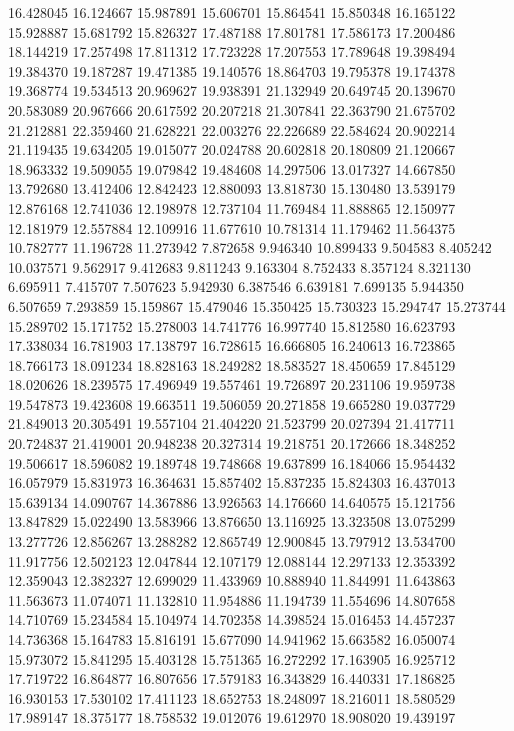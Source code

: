 16.428045
16.124667
15.987891
15.606701
15.864541
15.850348
16.165122
15.928887
15.681792
15.826327
17.487188
17.801781
17.586173
17.200486
18.144219
17.257498
17.811312
17.723228
17.207553
17.789648
19.398494
19.384370
19.187287
19.471385
19.140576
18.864703
19.795378
19.174378
19.368774
19.534513
20.969627
19.938391
21.132949
20.649745
20.139670
20.583089
20.967666
20.617592
20.207218
21.307841
22.363790
21.675702
21.212881
22.359460
21.628221
22.003276
22.226689
22.584624
20.902214
21.119435
19.634205
19.015077
20.024788
20.602818
20.180809
21.120667
18.963332
19.509055
19.079842
19.484608
14.297506
13.017327
14.667850
13.792680
13.412406
12.842423
12.880093
13.818730
15.130480
13.539179
12.876168
12.741036
12.198978
12.737104
11.769484
11.888865
12.150977
12.181979
12.557884
12.109916
11.677610
10.781314
11.179462
11.564375
10.782777
11.196728
11.273942
7.872658
9.946340
10.899433
9.504583
8.405242
10.037571
9.562917
9.412683
9.811243
9.163304
8.752433
8.357124
8.321130
6.695911
7.415707
7.507623
5.942930
6.387546
6.639181
7.699135
5.944350
6.507659
7.293859
15.159867
15.479046
15.350425
15.730323
15.294747
15.273744
15.289702
15.171752
15.278003
14.741776
16.997740
15.812580
16.623793
17.338034
16.781903
17.138797
16.728615
16.666805
16.240613
16.723865
18.766173
18.091234
18.828163
18.249282
18.583527
18.450659
17.845129
18.020626
18.239575
17.496949
19.557461
19.726897
20.231106
19.959738
19.547873
19.423608
19.663511
19.506059
20.271858
19.665280
19.037729
21.849013
20.305491
19.557104
21.404220
21.523799
20.027394
21.417711
20.724837
21.419001
20.948238
20.327314
19.218751
20.172666
18.348252
19.506617
18.596082
19.189748
19.748668
19.637899
16.184066
15.954432
16.057979
15.831973
16.364631
15.857402
15.837235
15.824303
16.437013
15.639134
14.090767
14.367886
13.926563
14.176660
14.640575
15.121756
13.847829
15.022490
13.583966
13.876650
13.116925
13.323508
13.075299
13.277726
12.856267
13.288282
12.865749
12.900845
13.797912
13.534700
11.917756
12.502123
12.047844
12.107179
12.088144
12.297133
12.353392
12.359043
12.382327
12.699029
11.433969
10.888940
11.844991
11.643863
11.563673
11.074071
11.132810
11.954886
11.194739
11.554696
14.807658
14.710769
15.234584
15.104974
14.702358
14.398524
15.016453
14.457237
14.736368
15.164783
15.816191
15.677090
14.941962
15.663582
16.050074
15.973072
15.841295
15.403128
15.751365
16.272292
17.163905
16.925712
17.719722
16.864877
16.807656
17.579183
16.343829
16.440331
17.186825
16.930153
17.530102
17.411123
18.652753
18.248097
18.216011
18.580529
17.989147
18.375177
18.758532
19.012076
19.612970
18.908020
19.439197

